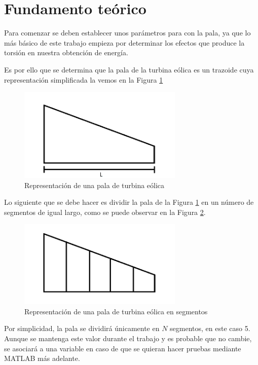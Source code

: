 \section{Fundamento teórico}

Para comenzar se deben establecer unos parámetros para con la pala, ya que lo más básico de este trabajo empieza por determinar los efectos que produce la torsión en nuestra obtención de energía.

Es por ello que se determina que la pala de la turbina eólica es un trazoide cuya representación simplificada la vemos en la Figura \ref{fig:pala_simp}

\begin{figure}[H]
    \centering
    \includegraphics[width=0.7\textwidth]{images/pala turbina paint.png}
    \caption{Representación de una pala de turbina eólica}
    \label{fig:pala_simp}
\end{figure}


Lo siguiente que se debe hacer es dividir la pala de la Figura \ref{fig:pala_simp} en un número de segmentos de igual largo, como se puede observar en la Figura \ref{fig:pala_dividida}.
    \textbf{}
    \begin{figure}[H]
    \centering
    \includegraphics[width=0.7\textwidth]{images/pala dividida.png}
    \caption{Representación de una pala de turbina eólica en segmentos}
    \label{fig:pala_dividida}
\end{figure}

Por simplicidad, la pala se dividirá únicamente en $N$ segmentos, en este caso 5. Aunque se mantenga este valor durante el trabajo y es probable que no cambie, se asociará a una variable en caso de que se quieran hacer pruebas mediante MATLAB más adelante. \\\\
    


